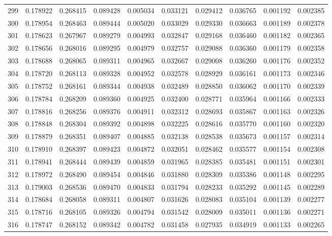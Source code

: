 \begin{tabular}{lrrrrrrrrr}
299 & 0.178922 & 0.268415 & 0.089428 & 0.005034 & 0.033121 & 0.029412 & 0.036765 & 0.001192 & 0.002385 \\
300 & 0.178954 & 0.268463 & 0.089444 & 0.005020 & 0.033029 & 0.029330 & 0.036663 & 0.001189 & 0.002378 \\
301 & 0.178623 & 0.267967 & 0.089279 & 0.004993 & 0.032847 & 0.029168 & 0.036460 & 0.001182 & 0.002365 \\
302 & 0.178656 & 0.268016 & 0.089295 & 0.004979 & 0.032757 & 0.029088 & 0.036360 & 0.001179 & 0.002358 \\
303 & 0.178688 & 0.268065 & 0.089311 & 0.004965 & 0.032667 & 0.029008 & 0.036260 & 0.001176 & 0.002352 \\
304 & 0.178720 & 0.268113 & 0.089328 & 0.004952 & 0.032578 & 0.028929 & 0.036161 & 0.001173 & 0.002346 \\
305 & 0.178752 & 0.268161 & 0.089344 & 0.004938 & 0.032489 & 0.028850 & 0.036062 & 0.001170 & 0.002339 \\
306 & 0.178784 & 0.268209 & 0.089360 & 0.004925 & 0.032400 & 0.028771 & 0.035964 & 0.001166 & 0.002333 \\
307 & 0.178816 & 0.268256 & 0.089376 & 0.004911 & 0.032312 & 0.028693 & 0.035867 & 0.001163 & 0.002326 \\
308 & 0.178848 & 0.268304 & 0.089392 & 0.004898 & 0.032225 & 0.028616 & 0.035770 & 0.001160 & 0.002320 \\
309 & 0.178879 & 0.268351 & 0.089407 & 0.004885 & 0.032138 & 0.028538 & 0.035673 & 0.001157 & 0.002314 \\
310 & 0.178910 & 0.268397 & 0.089423 & 0.004872 & 0.032051 & 0.028462 & 0.035577 & 0.001154 & 0.002308 \\
311 & 0.178941 & 0.268444 & 0.089439 & 0.004859 & 0.031965 & 0.028385 & 0.035481 & 0.001151 & 0.002301 \\
312 & 0.178972 & 0.268490 & 0.089454 & 0.004846 & 0.031880 & 0.028309 & 0.035386 & 0.001148 & 0.002295 \\
313 & 0.179003 & 0.268536 & 0.089470 & 0.004833 & 0.031794 & 0.028233 & 0.035292 & 0.001145 & 0.002289 \\
314 & 0.178684 & 0.268058 & 0.089311 & 0.004807 & 0.031626 & 0.028083 & 0.035104 & 0.001139 & 0.002277 \\
315 & 0.178716 & 0.268105 & 0.089326 & 0.004794 & 0.031542 & 0.028009 & 0.035011 & 0.001136 & 0.002271 \\
316 & 0.178747 & 0.268152 & 0.089342 & 0.004782 & 0.031458 & 0.027935 & 0.034919 & 0.001133 & 0.002265 \\

\end{tabular}
